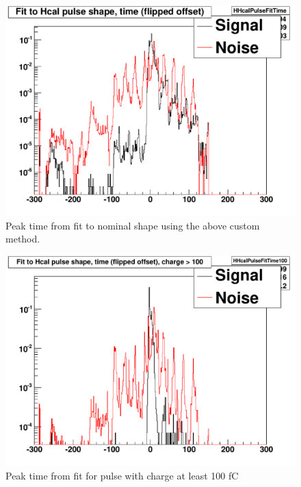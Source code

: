 \begin{figure}
\includegraphics[width=120mm]{DailyLog/6275/6275HHcalPulseFitTime.pdf}
\caption{Peak time from fit to nominal shape using the above custom method.}
\label{Figure_6275HHcalPulseFitTime}
\end{figure}

\begin{figure}
\includegraphics[width=120mm]{DailyLog/6275/6275HHcalPulseFitTime100.pdf}
\caption{Peak time from fit for pulse with charge at least 100 fC}
\label{Figure_6275HHcalPulseFitTime100}
\end{figure}


